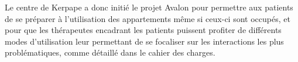 Le centre de Kerpape a donc initié le projet Avalon pour permettre aux patients de se préparer à l'utilisation des appartements même si ceux-ci sont occupés, et pour que les thérapeutes encadrant les patients puissent profiter de différents modes d'utilisation leur permettant de se focaliser sur les interactions les plus problématiques, comme détaillé dans le cahier des charges.
